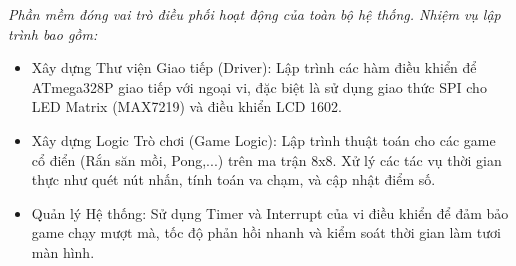 \textit{Phần mềm đóng vai trò điều phối hoạt động của toàn bộ hệ thống. Nhiệm vụ lập trình bao gồm:}
\begin{itemize}
    \item Xây dựng Thư viện Giao tiếp (Driver): Lập trình các hàm điều khiển để ATmega328P giao tiếp với ngoại vi, đặc biệt là sử dụng giao thức SPI cho LED Matrix (MAX7219) và điều khiển LCD 1602.
    \item Xây dựng Logic Trò chơi (Game Logic): Lập trình thuật toán cho các game cổ điển (Rắn săn mồi, Pong,...) trên ma trận 8x8. Xử lý các tác vụ thời gian thực như quét nút nhấn, tính toán va chạm, và cập nhật điểm số.
    \item Quản lý Hệ thống: Sử dụng Timer và Interrupt của vi điều khiển để đảm bảo game chạy mượt mà, tốc độ phản hồi nhanh và kiểm soát thời gian làm tươi màn hình.
\end{itemize}